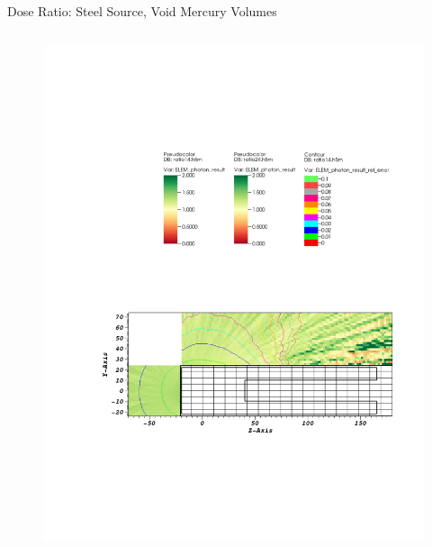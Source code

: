 \documentclass{beamer}
\begin{document}
\begin{frame}{Dose Ratio: Steel Source, Void Mercury Volumes}
\begin{columns}[T]

        \begin{figure}
                \centering
                \includegraphics[scale=0.49,trim={2.5cm 6cm 1cm 15cm},clip]{figs/ratio_steel_void.pdf}
        \end{figure}


\end{columns}
\end{frame}
\end{document}
